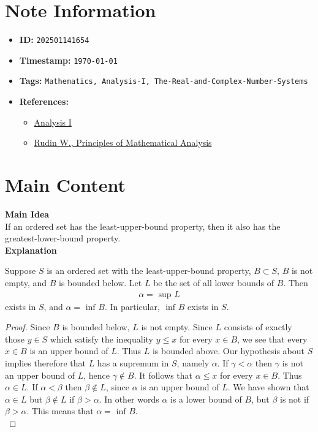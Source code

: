 \clearpage
{}
\label{202501141654}
\renewcommand{\notetitle}{Relation between Sup and Inf}

\section*{Note Information}
\begin{itemize}
  \item \textbf{ID:} \texttt{202501141654}
  \item \textbf{Timestamp:} \texttt{\today \ \currenttime}
  \item \textbf{Tags:} \texttt{Mathematics, Analysis-I, The-Real-and-Complex-Number-Systems}
  \item \textbf{References:}
    \begin{itemize}
      \item \href{https://ocw.mit.edu/courses/18-100b-analysis-i-fall-2010/}{Analysis I}
      \item \href{/home/garrett/Personal/References/Mathematics/Analysis-I/Rudin.pdf}{Rudin W., Principles of Mathematical Analysis}
    \end{itemize}
\end{itemize}


\section*{Main Content}
\textbf{Main Idea}\\
If an ordered set has the least-upper-bound property, then it also has the greatest-lower-bound property.\\

\textbf{Explanation}\\
\begin{theorem}
  Suppose $S$ is an ordered set with the least-upper-bound property, $B \subset S$, $B$ is not empty, and $B$ is bounded below. Let $L$ be the set of all lower bounds of $B$. Then 
\begin{align*}
  \alpha = \text{ sup } L
\end{align*}
exists in $S$, and $\alpha = \text{ inf } B$. In particular, $\text{ inf } B$ exists in $S$.\\
\end{theorem}

\begin{proof}
  Since $B$ is bounded below, $L$ is not empty. Since $L$ consists of exactly those $y \in S$ which satisfy the inequality $y \leq x$ for every $x \in B$, we see that every $x \in B$ is an upper bound of $L$. Thus $L$ is bounded above. Our hypothesis about $S$ implies therefore that $L$ has a supremum in $S$, namely $\alpha$. If $\gamma < \alpha$ then $\gamma$ is not an upper bound of $L$, hence $\gamma \not\in B$. It follows that $\alpha \leq x$ for every $x \in B$. Thus $\alpha \in L$. If $\alpha < \beta$ then $\beta \not \in L$, since $\alpha$ is an upper bound of $L$. We have shown that $\alpha \in L$ but $\beta \not \in L$ if $\beta > \alpha$. In other words $\alpha$ is a lower bound of $B$, but $\beta$ is not if $\beta > \alpha$. This means that $\alpha = \text{ inf } B$.  \\
\end{proof}


